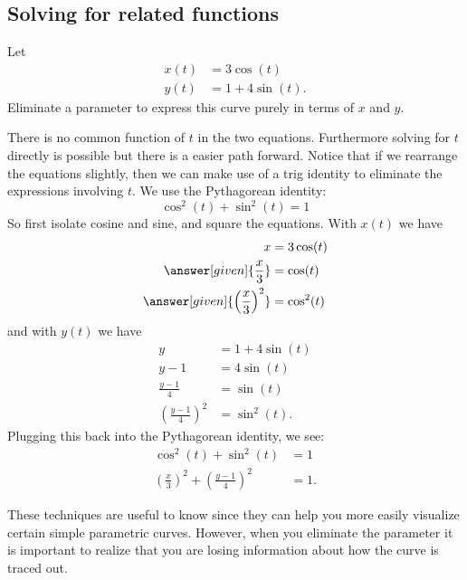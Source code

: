 \documentclass{ximera}
\begin{document}
\subsection{Solving for related functions}



\begin{example}
  Let
  \begin{align*}
    x(t) &= 3\cos(t)\\
    y(t) &= 1+4\sin(t).
  \end{align*}
  Eliminate a parameter to express this curve purely in terms of $x$ and $y$.
  \begin{explanation}
    There is no common function of $t$ in the two equations. Furthermore solving for $t$ directly is possible but there is a easier path forward. Notice that if we rearrange the equations slightly, then we can make use of a trig identity to eliminate the expressions involving $t$.  We use the Pythagorean identity:
    \[
    \cos^2(t) + \sin^2(t) = 1
    \]
    So first isolate cosine and sine, and square the equations. With $x(t)$ we have
    \begin{align*}
      x &= 3 \cos(t) \\
      \answer[given]{\frac{x}{3}} &= \cos(t)\\
      \answer[given]{\left(\frac{x}{3}\right)^2} &= \cos^2(t)
    \end{align*}
    and with $y(t)$ we have
    \begin{align*}
      y &= 1 + 4\sin(t)\\
      y-1 &= 4\sin(t)\\
      \frac{y-1}{4} &= \sin(t)\\
      \left(\frac{y-1}{4}\right)^2 &= \sin^2(t).
    \end{align*}
    Plugging this back into the Pythagorean identity, we see:
    \begin{align*}
      \cos^2(t) + \sin^2(t) &= 1\\
      \left(\frac{x}{3}\right)^2 + \left(\frac{y-1}{4}\right)^2 &= 1.
    \end{align*}
  \end{explanation}
\end{example}

These techniques are useful to know since they can help you more easily visualize certain simple parametric curves. However, when you eliminate the parameter it is important to realize that you are losing information about how the curve is traced out.
\end{document}
